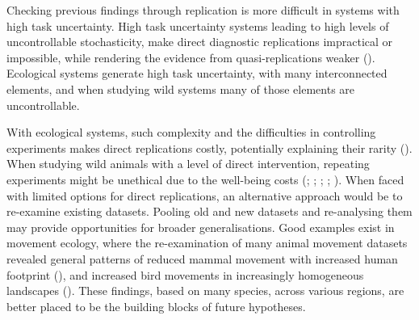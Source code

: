 \documentclass[10pt,a4paper]{article}
\begin{document}
Checking previous findings through replication is more difficult in systems with high task uncertainty.
High task uncertainty systems leading to high levels of uncontrollable stochasticity, make direct diagnostic replications impractical or impossible, while rendering the evidence from quasi-replications weaker ().
Ecological systems generate high task uncertainty, with many interconnected elements, and when studying wild systems many of those elements are uncontrollable.

With ecological systems, such complexity and the difficulties in controlling experiments makes direct replications costly, potentially explaining their rarity ().
When studying wild animals with a level of direct intervention, repeating experiments might be unethical due to the well-being costs (; ; ; ; ).
When faced with limited options for direct replications, an alternative approach would be to re-examine existing datasets.
Pooling old and new datasets and re-analysing them may provide opportunities for broader generalisations.
Good examples exist in movement ecology, where the re-examination of many animal movement datasets revealed general patterns of reduced mammal movement with increased human footprint (), and increased bird movements in increasingly homogeneous landscapes ().
These findings, based on many species, across various regions, are better placed to be the building blocks of future hypotheses.
\end{document}
